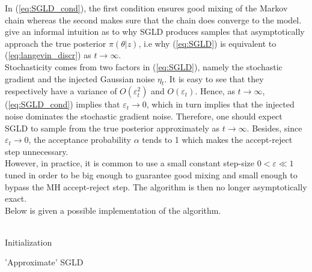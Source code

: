\documentclass[11pt,a4paper]{report}\usepackage[]{graphicx}\usepackage[]{color}
\begin{document}
In (\ref{eq:SGLD_cond}), the first condition ensures good mixing of the Markov chain whereas the second makes sure that the chain does converge to the model.\\
\cite{welling2011bayesian} give an informal intuition as to why SGLD produces samples that asymptotically approach the true posterior $\pi(\theta|z)$, i.e why (\ref{eq:SGLD}) is equivalent to (\ref{eq:langevin_discr}) as $t\rightarrow\infty$. \\
Stochasticity comes from two factors in (\ref{eq:SGLD}), namely the stochastic gradient and the injected Gaussian noise $\eta_t$. It is easy to see that they respectively have a variance of $O(\varepsilon^2_t)$ and $O(\varepsilon_t)$. Hence, as $t\rightarrow\infty$, (\ref{eq:SGLD_cond}) implies that $\varepsilon_t\rightarrow 0$, which in turn implies that the injected noise dominates the stochastic gradient noise. Therefore, one should expect SGLD to sample from the true posterior approximately as $t\rightarrow\infty$. Besides, since $\varepsilon_t\rightarrow 0$, the acceptance probability $\alpha$ tends to 1 which makes the accept-reject step unnecessary. \\
However, in practice, it is common to use a small constant step-size $0<\varepsilon\ll 1$ tuned in order to be big enough to guarantee good mixing and small enough to bypass the MH accept-reject step. The algorithm is then no longer asymptotically exact.\\
Below is given a possible implementation of the algorithm.\\
\\
\begin{algorithm}[H]
\label{algo:SGLD}
 Initialization\;
 \caption{'Approximate' SGLD}
\end{algorithm}

\newpage
\end{document}
